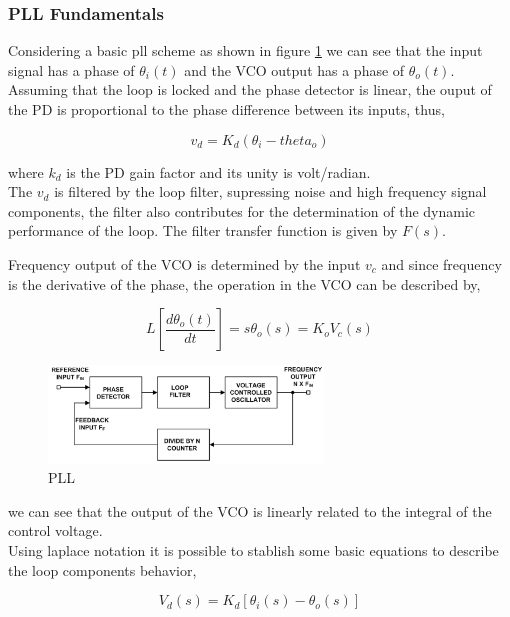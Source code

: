 \subsubsection{PLL Fundamentals}
Considering a basic pll scheme as shown in figure \ref{fig:pll2} we can see that
the input signal has a phase of $\theta_i(t)$ and the VCO output has a phase of
$\theta_o(t)$. Assuming that the loop is locked and the phase detector is
linear, the ouput of the PD is proportional to the phase difference between its
inputs, thus,

\begin{equation}
    v_d = K_d(\theta_i - theta_o)
    \label{eq:pdout}
\end{equation}

where $k_d$ is the PD gain factor and its unity is volt/radian.\\

The $v_d$ is filtered by the loop filter, supressing noise and high frequency
signal components, the filter also contributes for the determination of the
dynamic performance of the loop. The filter transfer function is given by
$F(s)$.

Frequency output of the VCO is determined by the input $v_c$ and since frequency
is the derivative of the phase, the operation in the VCO can be described by,

\begin{equation}
    L[\frac{d\theta_o(t)}{dt}] = s\theta_o(s)=K_oV_c(s)
    \label{eq:vco}
\end{equation}

\begin{figure}[htbp]
    \centering
    \includegraphics[width=0.65\textwidth]{./figures/pll.eps}
    \caption{ PLL
    \label{fig:pll2}}
\end{figure}

we can see that the output of the VCO is linearly related to the integral of the
control voltage.\\

Using laplace notation it is possible to stablish some basic equations to
describe the loop components behavior,

\begin{equation}
    V_d(s)=K_d[\theta_i(s) - \theta_o(s)]
    \label{eq:vd}
\end{equation}

